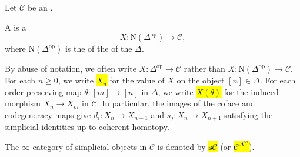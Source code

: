 \begin{definition} \label{definition:simplicial_object_in_an_infty_category}
    Let $\mathcal{C}$ be an .

    A  is a 
    \[
    X : \mathrm{N}(\Delta^{\mathrm{op}}) \to \mathcal{C},
    \]
    where $\mathrm{N}(\Delta^{\mathrm{op}})$ is the  of the  of the  $\Delta$.

    By abuse of notation, we often write $X : \Delta^{\mathrm{op}} \to \mathcal{C}$ rather than $X : \mathrm{N}(\Delta^{\mathrm{op}}) \to \mathcal{C}$. For each $n \ge 0$, we write \hl{$X_n$} for the value of $X$ on the object $[n] \in \Delta$. For each order-preserving map $\theta : [m] \to [n]$ in $\Delta$, we write \hl{$X(\theta)$} for the induced morphism $X_n \to X_m$ in $\mathcal{C}$. In particular, the images of the coface and codegeneracy maps give  $d_i : X_n \to X_{n-1}$ and  $s_j : X_n \to X_{n+1}$ satisfying the simplicial identities up to coherent homotopy.

    The $\infty$-category of simplicial objects in $\mathcal{C}$ is denoted by \hl{$\mathbf{s}\mathcal{C}$} (or \hl{$\mathcal{C}^{\Delta^{\mathrm{op}}}$}).
\end{definition}




